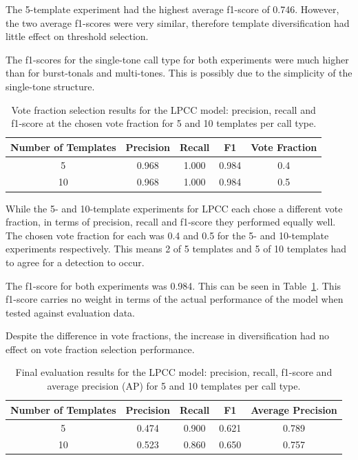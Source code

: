 The 5-template experiment had the highest average f1-score of 0.746. However, the two average f1-scores were very similar, therefore template 
diversification had little effect on threshold selection.

The f1-scores for the single-tone call type for both experiments were much higher than for burst-tonals and multi-tones. This is possibly 
due to the simplicity of the single-tone structure.

\begin{table}[H]
    \caption{Vote fraction selection results for the LPCC model: precision, recall and f1-score 
    at the chosen vote fraction for 5 and 10 templates per call type.}
    \footnotesize
    \setlength{\tabcolsep}{3pt}
    \centering
    \begin{tabular}{ccccc}
        \toprule
        Number of Templates & Precision & Recall & F1 & Vote Fraction\\
        \midrule
        5 & 0.968 & 1.000 & 0.984 & 0.4 \\
        10 & 0.968 & 1.000 & 0.984 & 0.5 \\
        \bottomrule
    \end{tabular}\label{tab:lpc_vote_results}
\end{table}

While the 5- and 10-template experiments for \acs{LPCC} each chose a different vote fraction, 
in terms of precision, recall and f1-score they performed equally well. The chosen vote fraction for each was 0.4 and 0.5 for the 5- and 
10-template experiments respectively. This means 2 of 5 templates and 5 of 10 templates had to agree for a detection to occur. 

The f1-score for both experiments was 0.984. This can be seen in Table~\ref{tab:lpc_vote_results}. 
This f1-score carries no weight in terms of the actual performance of the model when tested against evaluation data.

Despite the difference in vote fractions, the increase in diversification had no effect on vote fraction selection performance.

\begin{table}[H]
    \caption{Final evaluation results for the LPCC model: precision, recall, f1-score and 
    average precision (AP) for 5 and 10 templates per call type.}
    \footnotesize
    \setlength{\tabcolsep}{3pt}
    \centering
    \begin{tabular}{ccccc}
        \toprule
        Number of Templates & Precision & Recall & F1 & Average Precision \\
        \midrule
        5  & 0.474 & 0.900 & 0.621 & 0.789 \\
        10 & 0.523 & 0.860 & 0.650 & 0.757 \\
        \bottomrule
    \end{tabular}\label{tab:lpc_test_results}
\end{table}

